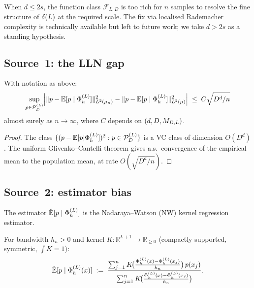\begin{remark}
\label{III:rem:d>2s}
When $d \leq 2s$, the function class $\mathcal{F}_{L,D}$ is too rich for
$n$ samples to resolve the fine structure of $\delta(L)$ at the required scale.
The fix via localised Rademacher complexity \cite{BartlettBousquetMendelson2005}
is technically available but left to future work; we take $d > 2s$ as
a standing hypothesis.
\end{remark}

\subsection{Source~1: the LLN gap}
\label{III:subsec:source1}

\begin{lemma}
\label{III:lem:source1}
With notation as above:
\[
  \sup_{p \in \mathcal{P}_D^{(L)}}
  \Bigl|
    \|p - \mathbb{E}[p \mid \Phi_h^{(L)}]\|_{L^{2}(\mu_n)}^2
    - \|p - \mathbb{E}[p \mid \Phi_h^{(L)}]\|_{L^{2}(\mu)}^2
  \Bigr|
  \;\leq\; C\sqrt{D^d/n}
\]
almost surely as $n \to \infty$, where $C$ depends on $(d,D,M_{D,L})$.
\end{lemma}

\begin{proof}
The class $\{(p - \mathbb{E}[p|\Phi_h^{(L)}])^2 : p \in \mathcal{P}_D^{(L)}\}$ is a VC class
of dimension $O(D^d)$.
The uniform Glivenko--Cantelli theorem \cite{Gyorfi2002} gives a.s.\ convergence
of the empirical mean to the population mean, at rate $O(\sqrt{D^d/n})$.
\end{proof}

\subsection{Source~2: estimator bias}
\label{III:subsec:source2}

The estimator $\hat{\mathbb{E}}[p \mid \Phi_h^{(L)}]$ is the Nadaraya--Watson (NW) kernel
regression estimator.

\begin{definition}
\label{III:def:nw}
For bandwidth $h_n > 0$ and kernel $K : \mathbb{R}^{L+1} \to \mathbb{R}_{\geq 0}$
(compactly supported, symmetric, $\int K = 1$):
\[
  \Ehat[p \mid \PhiL(x)]
  \;:=\;
  \frac{\sum_{j=1}^n K\!\bigl(\tfrac{\PhiL(x)-\PhiL(x_j)}{h_n}\bigr)\,p(x_j)}%
       {\sum_{j=1}^n K\!\bigl(\tfrac{\PhiL(x)-\PhiL(x_j)}{h_n}\bigr)}.
\]
\end{definition}

